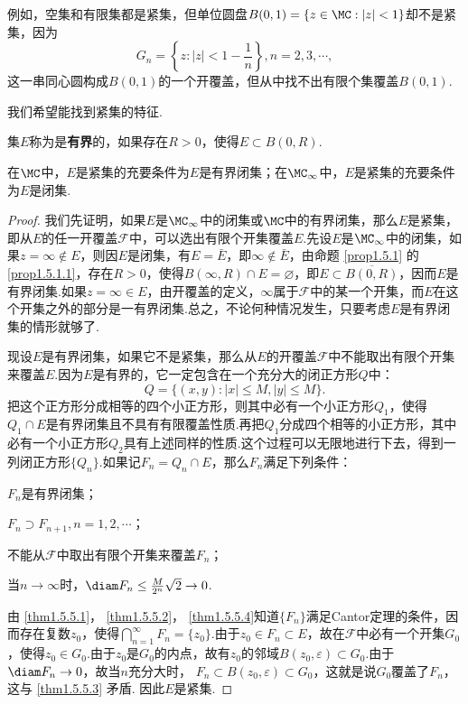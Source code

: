 例如，空集和有限集都是紧集，但单位圆盘$B(0,1)=\{z\in\MC:|z|<1\}$却不是紧集，因为
  \[G_n=\left\{z:|z|<1-\frac1n\right\},n=2,3,\cdots,\]
这一串同心圆构成$B(0,1)$的一个开覆盖，但从中找不出有限个集覆盖$B(0,1)$.

我们希望能找到紧集的特征.

集$E$称为是\textbf{有界}的，如果存在$R>0$，使得$E\subset B(0,R)$.
\begin{theorem}\label{thm1.5.5}
在$\MC$中，$E$是紧集的充要条件为$E$是有界闭集；在$\MC_\infty$中，$E$是紧集的充要条件为$E$是闭集.
\end{theorem}
\begin{proof}
我们先证明，如果$E$是$\MC_\infty$中的闭集或$\MC$中的有界闭集，那么$E$是紧集，即从$E$的任一开覆盖$\mathscr F$中，可以选出有限个开集覆盖$E$.先设$E$是$\MC_\infty$中的闭集，如果$z=\infty\notin E$，则因$E$是闭集，有$E=\bar E$，即$\infty\notin\bar E$，由命题 \ref{prop1.5.1} 的 \ref{prop1.5.1.1}，存在$R>0$，使得$B(\infty,R)\cap E=\varnothing$，即$E\subset\overline{B(0,R)}$，因而$E$是有界闭集.如果$z=\infty\in E$，由开覆盖的定义，$\infty$属于$\mathscr F$中的某一个开集，而$E$在这个开集之外的部分是一有界闭集.总之，不论何种情况发生，只要考虑$E$是有界闭集的情形就够了.

现设$E$是有界闭集，如果它不是紧集，那么从$E$的开覆盖$\mathscr F$中不能取出有限个开集来覆盖$E$.因为$E$是有界的，它一定包含在一个充分大的闭正方形$Q$中：
\[Q=\{(x,y):|x|\le M,|y|\le M\}.\]
把这个正方形分成相等的四个小正方形，则其中必有一个小正方形$Q_1$，使得$Q_1\cap E$是有界闭集且不具有有限覆盖性质.再把$Q_1$分成四个相等的小正方形，其中必有一个小正方形$Q_2$具有上述同样的性质.这个过程可以无限地进行下去，得到一列闭正方形$\{Q_n\}$.如果记$F_n=Q_n\cap E$，那么$F_n$满足下列条件：
\begin{eenum}
 \item  \label{thm1.5.5.1}$F_n$是有界闭集；
 \item  \label{thm1.5.5.2}$F_n\supset F_{n+1},n=1,2,\cdots$；
 \item  \label{thm1.5.5.3}不能从$\mathscr F$中取出有限个开集来覆盖$F_n$；
 \item  \label{thm1.5.5.4}当$n\to\infty$时，$\diam F_n\le\frac M{2^n}\sqrt2\to0$.
\end{eenum}
由 \ref{thm1.5.5.1}， \ref{thm1.5.5.2}， \ref{thm1.5.5.4}知道$\{F_n\}$满足Cantor定理的条件，因而存在复数$z_0$，使得$\bigcap_{n=1}^\infty F_n=\{z_0\}$.由于$z_0\in F_n\subset E$，故在$\mathscr F$中必有一个开集$G_0$，使得$z_0\in G_0$.由于$z_0$是$G_0$的内点，故有$z_0$的邻域$B(z_0,\varepsilon)\subset G_0$.由于$\diam F_n\to0$，故当$n$充分大时， $F_n\subset B(z_0,\varepsilon)\subset G_0$，这就是说$G_0$覆盖了$F_n$，这与 \ref{thm1.5.5.3} 矛盾. 因此$E$是紧集.


\end{proof}
